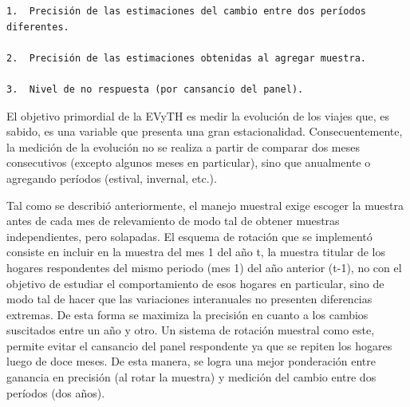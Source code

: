 \documentclass[
  openany]{book}
\begin{document}
\begin{verbatim}
1.  Precisión de las estimaciones del cambio entre dos períodos diferentes.

2.  Precisión de las estimaciones obtenidas al agregar muestra.

3.  Nivel de no respuesta (por cansancio del panel).
\end{verbatim}

El objetivo primordial de la EVyTH es medir la evolución de los viajes que, es sabido, es una variable que presenta una gran estacionalidad. Consecuentemente, la medición de la evolución no se realiza a partir de comparar dos meses consecutivos (excepto algunos meses en particular), sino que anualmente o agregando períodos (estival, invernal, etc.).

Tal como se describió anteriormente, el manejo muestral exige escoger la muestra antes de cada mes de relevamiento de modo tal de obtener muestras independientes, pero solapadas. El esquema de rotación que se implementó consiste en incluir en la muestra del mes 1 del año t, la muestra titular de los hogares respondentes del mismo periodo (mes 1) del año anterior (t-1), no con el objetivo de estudiar el comportamiento de esos hogares en particular, sino de modo tal de hacer que las variaciones interanuales no presenten diferencias extremas. De esta forma se maximiza la precisión en cuanto a los cambios suscitados entre un año y otro. Un sistema de rotación muestral como este, permite evitar el cansancio del panel respondente ya que se repiten los hogares luego de doce meses. De esta manera, se logra una mejor ponderación entre ganancia en precisión (al rotar la muestra) y medición del cambio entre dos períodos (dos años).
\end{document}
